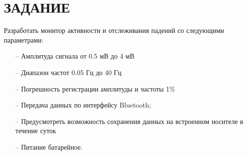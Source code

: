 \begin{sloppypar} %
\newpage %
\section*{ЗАДАНИЕ} %

Разработать монитор активности и отслеживания падений  со следующими параметрами: 
\begin{itemize}
	\item[--]Амплитуда сигнала от 0.5 мВ до 4 мВ

	\item[--]Диапазон частот 0.05 Гц до 40 Гц
	\item[--]Погрешность регистрации амплитуды и частоты 1\%
	\item[--]Передача данных по интерфейсу Bluetooth;
	\item[--]Предусмотреть возможность сохранения данных на встроенном носителе в течение суток
	\item[--]Питание батарейное.
\end{itemize}
\end{sloppypar}